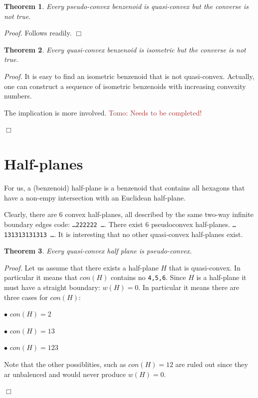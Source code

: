 \documentclass[a4paper,10pt]{article}
\newcounter{theorem}
\newtheorem{theorem}{Theorem}[section]
\newenvironment{proof}{\medskip\emph{Proof.}}{\hfill$\Box$\medskip}
\newcommand\Tomo[1]{\textcolor{brown}{Tomo: #1}}
\begin{document}
{\begin{theorem}
Every pseudo-convex benzenoid is quasi-convex  but the converse is not true.
\end{theorem}

\begin{proof}
Follows readily.
\end{proof}


\begin{theorem}
Every quasi-convex benzenoid is isometric but the converse is not true.
\end{theorem}
\begin{proof}
It is easy to find an isometric benzenoid that is not quasi-convex. Actually, one can construct a sequence of isometric benzenoids with
increasing convexity numbers.

The implication is more involved.
\Tomo{Needs to be completed!}


\end{proof}


\section{Half-planes}

For us, a (benzenoid) half-plane is a benzenoid that contains all hexagons that have a non-empy intersection with an Euclidean half-plane. 

Clearly, there are 6 convex half-planes, all described by the same two-way infinite boundary edges code: {\tt \ldots 222222 \ldots}. 
There exist 6 pseudoconvex half-planes. {\tt \ldots 131313131313 \ldots}. It is interesting that no other quasi-convex half-planes exist.

\begin{theorem}
Every quasi-convex half plane is pseudo-convex.
\end{theorem}
\begin{proof}
Let us assume that there exists a half-plane $H$ that is quasi-convex. In particular it means that $con(H)$ contains no {\tt 4,5,6}. Since $H$ is a half-plane it must have a straight boundary: $w(H) = 0$.  In particular it means there are three cases for $con(H)$:

$\bullet$ $con(H) = 2$

$\bullet$ $con(H) = 13$

$\bullet$ $con(H) = 123$

Note that the other possiblities, such as $con(H) = 12$ are ruled out since they ar unbalenced and would never produce $w(H) = 0$.



\end{proof}}
\end{document}
